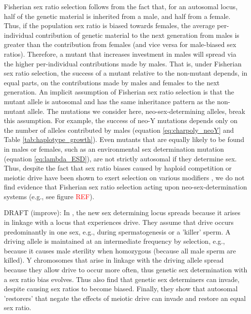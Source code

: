 \documentclass[12pt]{article}
\begin{document}
Fisherian sex ratio selection follows from the fact that, for an autosomal locus, half of the genetic material is inherited from a male, and half from a female. 
Thus, if the population sex ratio is biased towards females, the average per-individual contribution of genetic material to the next generation from males is greater than the contribution from females (and vice versa for male-biased sex ratios). 
Therefore, a mutant that increases investment in males will spread via the higher per-individual contributions made by males. 
That is, under Fisherian sex ratio selection, the success of a mutant relative to the non-mutant depends, in equal parts, on the contributions made by males and females to the next generation. 
An implicit assumption of Fisherian sex ratio selection is that the mutant allele is autosomal and has the same inheritance pattern as the non-mutant allele. 
The mutations we consider here, neo-sex-determining alleles, break this assumption. 
For example, the success of neo-Y mutations depends only on the number of alleles contributed by males (equation \ref{eq:charpoly_neoY} and Table \ref{tab:haplotype_growth}). 
Even mutants that are equally likely to be found in males or females, such as an environmental sex determination mutation (equation \ref{eq:lambda_ESD}), are not strictly autosomal if they determine sex. 
Thus, despite the fact that sex ratio biases caused by haploid competition or meiotic drive have been shown to exert selection on various modifiers \citep{Stalker:1961th,Smith:1975ft,Frank:1989vl,Hough:2013uo,Ubeda:2015fx, Otto:2015va}, we do not find evidence that Fisherian sex ratio selection acting upon neo-sex-determination systems (e.g., see figure \textcolor{red}{REF}). 


DRAFT (improve): In \citet{Ubeda:2015fx}, the new sex determining locus spreads because it arises in linkage with a locus that experiences drive. They assume that drive occurs predominantly in one sex, e.g., during spermatogenesis or a 'killer' sperm. A driving allele is maintained at an intermediate frequency by selection, e.g., because it causes male sterility when homozygous (because all male sperm are killed). Y chromosomes that arise in linkage with the driving allele spread because they allow drive to occur more often, thus genetic sex determination with a sex ratio bias evolves. 
Thus \citet{Ubeda:2015fx} also find that genetic sex determiners can invade, despite causing sex ratios to become biased. 
Finally, they show that autosomal 'restorers' that negate the effects of meiotic drive can invade and restore an equal sex ratio. 
\end{document}

